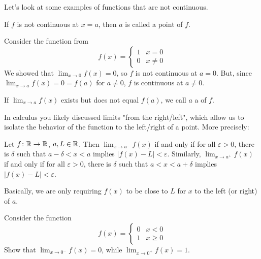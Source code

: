 \documentclass[../notes.tex]{subfiles}
\begin{document}



Let's look at some examples of functions that are not continuous. 

\begin{definition}
    If $f$ is not continuous at $x=a$, then $a$ is called a  point of $f$. 
\end{definition}

\begin{example} \label{ex:rem-discont-2}
    Consider the function from 
    \[ f(x) = \begin{cases}
        1 & x=0 \\
        0 & x\neq 0
    \end{cases}\]
    We showed that $\lim_{x\to 0}f(x) =0$, so $f$ is not continuous at $a=0$. But, since $\lim_{x\to a}f(x)=0=f(a)$ for $a\neq 0$, $f$ is continuous at $a\neq 0$. 
\end{example}

\begin{definition}
    If $\lim_{x\to a}f(x)$ exists but does not equal $f(a)$, we call $a$ a  of $f$. 
\end{definition}

In calculus you likely discussed limits "from the right/left", which allow us to isolate the behavior of the function to the left/right of a point. More precisely:

\begin{definition}
    Let $f\colon\mathbb R\to \mathbb R$, $a,L\in \mathbb R$. Then $\lim_{x\to a^-}f(x)$ if and only if for all $\varepsilon>0$, there is $\delta$ such that $a-\delta < x < a$ implies $|f(x)-L| < \varepsilon$. Similarly, $\lim_{x\to a^+}f(x)$ if and only if for all $\varepsilon>0$, there is $\delta$ such that $a < x < a+\delta$ implies $|f(x)-L| < \varepsilon$.
\end{definition}

Basically, we are only requiring $f(x)$ to be close to $L$ for $x$ to the left (or right) of $a$. 

\begin{exe}
    Consider the function 
    \[ f(x) = \begin{cases}
        0 & x < 0 \\
        1 & x \geq 0
    \end{cases}\]
    Show that $\lim_{x\to 0^-}f(x) = 0$, while $\lim_{x\to 0^+}f(x) = 1$. 
\end{exe}
\end{document}
